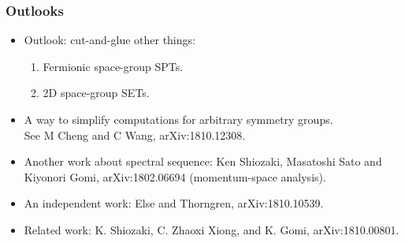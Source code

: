 \documentclass[xcolor=table, 11pt, aspectratio=169]{beamer}
\begin{document}
\begin{frame}
\frametitle{Outlooks}
\begin{itemize}
\item Outlook: cut-and-glue other things:
\begin{enumerate}
\item Fermionic space-group SPTs.
\item 2D space-group SETs.
\end{enumerate}
\item A way to simplify computations for arbitrary symmetry groups.\\
See M Cheng and C Wang, arXiv:1810.12308.
\item Another work about spectral sequence: Ken Shiozaki, Masatoshi Sato and Kiyonori Gomi, arXiv:1802.06694 (momentum-space analysis).
\item An independent work: Else and Thorngren, arXiv:1810.10539.
\item Related work: K. Shiozaki, C. Zhaoxi Xiong, and K. Gomi,
arXiv:1810.00801.
\end{itemize}
\end{frame}
\end{document}
